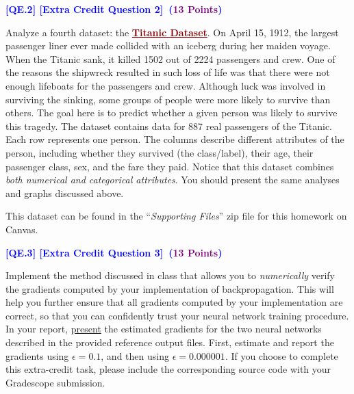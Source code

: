\documentclass{article}
\newcommand{\HIGHLIGHT}[1]{\textcolor{blue}{\textbf{#1}}}
\newcommand{\POINTS}[1]{\textcolor{purple}{\textbf{{#1}}}}
\begin{document}
    


    \vspace{1.25cm}
    \noindent \textbf{\HIGHLIGHT{[QE.2] [Extra Credit Question \raisebox{0.2ex}{\scalebox{0.8}{\textnormal{\#}}}2]~(\POINTS{13 Points})}} 
    \vspace{0.3cm}
    
    \noindent Analyze a fourth dataset: the \textcolor{darkred}{\textbf{\ul{Titanic Dataset}}}. On April 15, 1912, the largest passenger liner ever made collided with an iceberg during her maiden voyage. When the Titanic sank, it killed 1502 out of 2224 passengers and crew. One of the reasons the shipwreck resulted in such loss of life was that there were not enough lifeboats for the passengers and crew. Although luck was involved in surviving the sinking, some groups of people were more likely to survive than others. The goal here is to predict whether a given person was likely to survive this tragedy. The dataset contains data for 887 real passengers of the Titanic. Each row represents one person. The columns describe different attributes of the person, including whether they survived (the class/label), their age, their passenger class, sex, and the fare they paid. Notice that this dataset combines \textit{both numerical and categorical attributes}. You should present the same analyses and graphs discussed above.
    \begin{mybox}[boxgray] 
    This dataset can be found in the ``\textit{Supporting Files}'' zip file for this homework on Canvas.
    \end{mybox}





    \vspace{1.25cm}
    \noindent \textbf{\HIGHLIGHT{[QE.3] [Extra Credit Question \raisebox{0.2ex}{\scalebox{0.8}{\textnormal{\#}}}3]~(\POINTS{13 Points})}} 
    \vspace{0.3cm}
    
    \noindent Implement the method discussed in class that allows you to \textit{numerically} verify the gradients computed by your implementation of backpropagation. This will help you further ensure that all gradients computed by your implementation are correct, so that you can confidently trust your neural network training procedure. In your report, \ul{present} the estimated gradients for the two neural networks described in the provided reference output files. First, estimate and report the gradients using $\epsilon = 0.1$, and then using $\epsilon = 0.000001$. If you choose to complete this extra-credit task, please include the corresponding source code with your Gradescope submission.
\end{document}
